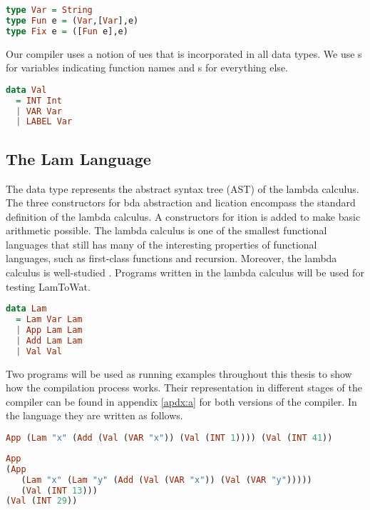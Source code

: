 \begin{lstlisting}[language=Haskell]
type Var = String
type Fun e = (Var,[Var],e)
type Fix e = ([Fun e],e)
\end{lstlisting}

Our compiler uses a notion of ues that is incorporated in all data types. We use s for variables indicating function names and s for everything else.

\begin{lstlisting}[language=Haskell]
data Val
  = INT Int
  | VAR Var
  | LABEL Var
\end{lstlisting}

\subsection{\label{subsection:expdata}The Lam Language}
The  data type represents the abstract syntax tree (AST) of the lambda calculus. The three constructors for bda abstraction and lication encompass the standard definition of the lambda calculus. A constructors for ition is added to make basic arithmetic possible. The lambda calculus is one of the smallest functional languages that still has many of the interesting properties of functional languages, such as first-class functions and recursion. Moreover, the lambda calculus is well-studied \autocite{barendregt1984lambda}. Programs written in the lambda calculus will be used for testing LamToWat.

\begin{lstlisting}[language=Haskell]
data Lam
  = Lam Var Lam
  | App Lam Lam
  | Add Lam Lam
  | Val Val
\end{lstlisting}

Two programs will be used as running examples throughout this thesis to show how the compilation process works. Their representation in different stages of the compiler can be found in appendix \ref{apdx:a} for both versions of the compiler. In the  language they are written as follows.

\begin{lstlisting}[language=Haskell]
App (Lam "x" (Add (Val (VAR "x")) (Val (INT 1)))) (Val (INT 41))
\end{lstlisting}

\begin{lstlisting}[language=Haskell]
App
(App
   (Lam "x" (Lam "y" (Add (Val (VAR "x")) (Val (VAR "y")))))
   (Val (INT 13)))
(Val (INT 29))
\end{lstlisting}

